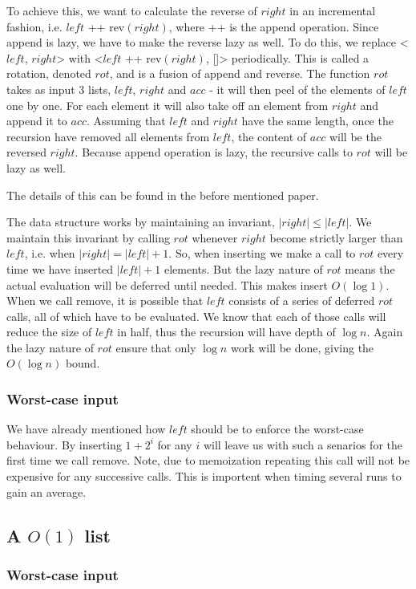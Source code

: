To achieve this, we want to calculate the reverse of $right$ in an incremental fashion, i.e. $left$ ++ rev$(right)$, where ++ is the append operation. Since append is lazy, we have to make the reverse lazy as well. To do this, we replace <$left$, $right$> with <$left$ ++ rev$(right)$, []> periodically. This is called a rotation, denoted $rot$, and is a fusion of append and reverse. The function $rot$ takes as input 3 lists, $left$, $right$ and $acc$ - it will then peel of the elements of $left$ one by one. For each element it will also take off an element from $right$ and append it to $acc$. Assuming that $left$ and $right$ have the same length, once the recursion have removed all elements from $left$, the content of $acc$ will be the reversed $right$. Because append operation is lazy, the recursive calls to $rot$ will be lazy as well.

The details of this can be found in the before mentioned paper.

The data structure works by maintaining an invariant, $|right| \leq |left|$. We maintain this invariant by calling $rot$ whenever $right$ become strictly larger than $left$, i.e. when $|right| = |left| + 1$. So, when inserting we make a call to $rot$ every time we have inserted $|left| +1$ elements. But the lazy nature of $rot$ means the actual evaluation will be deferred until needed. This makes insert $O(\log 1)$. When we call remove, it is possible that $left$ consists of a series of deferred $rot$ calls, all of which have to be evaluated. We know that each of those calls will reduce the size of $left$ in half, thus the recursion will have depth of $\log n$. Again the lazy nature of $rot$ ensure that only $\log n$ work will be done, giving the $O(\log n)$ bound.

\subsubsection{Worst-case input}
We have already mentioned how $left$ should be to enforce the worst-case behaviour. By inserting $1 + 2^i$ for any $i$ will leave us with such a senarios for the first time we call remove. Note, due to memoization repeating this call will not be expensive for any successive calls. This is importent when timing several runs to gain an average.

\subsection*{A $O(1)$ list}

\subsubsection{Worst-case input}